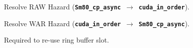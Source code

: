 {\LARGE
Resolve RAW Hazard (\textbf{\texttt{Sm80\_cp\_async $\to$ cuda\_in\_order}}).

}

\newpage
{}

{\large

}

{\LARGE
Resolve WAR Hazard (\textbf{\texttt{cuda\_in\_order $\to$ Sm80\_cp\_async}}).

Required to re-use ring buffer slot.

}

















